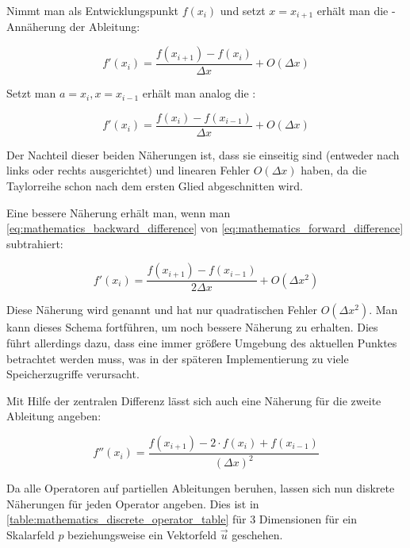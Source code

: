 Nimmt man als Entwicklungspunkt $f(x_i)$ und setzt $x=x_{i+1}$ erhält man die
-Annäherung der Ableitung:

\begin{equation}
\label{eq:mathematics_forward_difference}
f'(x_i) = \frac{f(x_{i+1}) - f(x_i)}{\Delta x} + O(\Delta x)
\end{equation}

Setzt man $a=x_i,x=x_{i-1}$ erhält man analog die
:

\begin{equation}
\label{eq:mathematics_backward_difference}
f'(x_i) = \frac{f(x_i) - f(x_{i-1})}{\Delta x} + O(\Delta x)
\end{equation}

Der Nachteil dieser beiden Näherungen ist, dass sie einseitig sind (entweder
nach links oder rechts ausgerichtet) und linearen Fehler $O(\Delta x)$ haben, da
die Taylorreihe schon nach dem ersten Glied abgeschnitten wird.

Eine bessere Näherung erhält man, wenn man
\autoref{eq:mathematics_backward_difference} von
\autoref{eq:mathematics_forward_difference} subtrahiert:

\begin{equation}
f'(x_i) = \frac{f(x_{i+1}) - f(x_{i-1})}{2 \Delta x} + O(\Delta x^2)
\end{equation}

Diese Näherung wird  genannt und
hat nur quadratischen Fehler $O(\Delta x^2)$. Man kann dieses Schema
fortführen, um noch bessere Näherung zu erhalten. Dies führt
allerdings dazu, dass eine immer größere Umgebung des aktuellen
Punktes betrachtet werden muss, was in der späteren Implementierung zu
viele Speicherzugriffe verursacht.

Mit Hilfe der zentralen Differenz lässt sich auch eine Näherung für die zweite
Ableitung angeben:

\begin{equation}
f''(x_i)
=
\frac
{
	f(
		x_{i+1}) -
	2 \cdot
	f(
		x_i)
	+
	f(
		x_{i-1})
}
{
	(\Delta x)^2
}
\end{equation}

Da alle Operatoren auf partiellen Ableitungen beruhen, lassen sich nun
diskrete Näherungen für jeden Operator angeben. Dies ist in
\autoref{table:mathematics_discrete_operator_table} für 3 Dimensionen für ein
Skalarfeld $p$ beziehungsweise ein Vektorfeld $\vec{u}$ geschehen.

